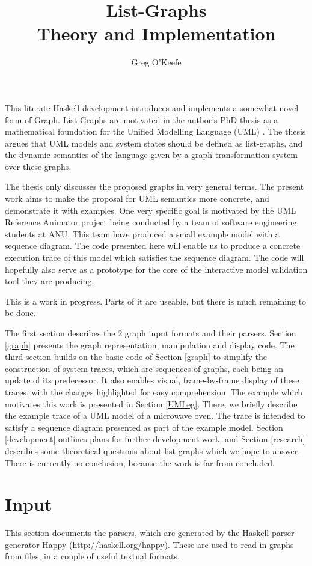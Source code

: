 \documentclass[a4paper]{article}
\title{{\bf List-Graphs}\\
Theory and Implementation}
\author{Greg O'Keefe}
\begin{document}
\maketitle 

This literate Haskell development introduces and implements a somewhat
novel form of Graph.  List-Graphs are motivated in the author's PhD
thesis \cite{myThesis} as a mathematical foundation for the Unified
Modelling Language (UML) \cite{UML22super}.  The thesis argues that
UML models and system states should be defined as list-graphs, and the
dynamic semantics of the language given by a graph transformation
system \cite{BH02} over these graphs.

The thesis only discusses the proposed graphs in very general terms.
The present work aims to make the proposal for UML semantics more
concrete, and demonstrate it with examples.  One very specific goal is
motivated by the UML Reference Animator project being conducted by a
team of software engineering students at ANU.  This team have produced
a small example model with a sequence diagram.  The code presented
here will enable us to produce a concrete execution trace of this
model which satisfies the sequence diagram.  The code will hopefully
also serve as a prototype for the core of the interactive model
validation tool they are producing.

This is a work in progress.  Parts of it are useable, but there is
much remaining to be done.

The first section describes the 2 graph input formats and their
parsers.  Section \ref{graph} presents the graph representation,
manipulation and display code. The third section builds on the basic
code of Section \ref{graph} to simplify the construction of system
traces, which are sequences of graphs, each being an update of its
predecessor.  It also enables visual, frame-by-frame display of these
traces, with the changes highlighted for easy comprehension.  The
example which motivates this work is presented in Section \ref{UMLeg}.
There, we briefly describe the example trace of a UML model of a
microwave oven.  The trace is intended to satisfy a sequence diagram
presented as part of the example model.  Section \ref{development}
outlines plans for further development work, and Section
\ref{research} describes some theoretical questions about list-graphs
which we hope to answer.  There is currently no conclusion, because
the work is far from concluded.

\newpage
\tableofcontents
\newpage
\section{Input}
\label{inputSection}
This section documents the parsers, which are generated by the Haskell
parser generator Happy (\url{http://haskell.org/happy}).  These are
used to read in graphs from files, in a couple of useful textual
formats.
\end{document}
